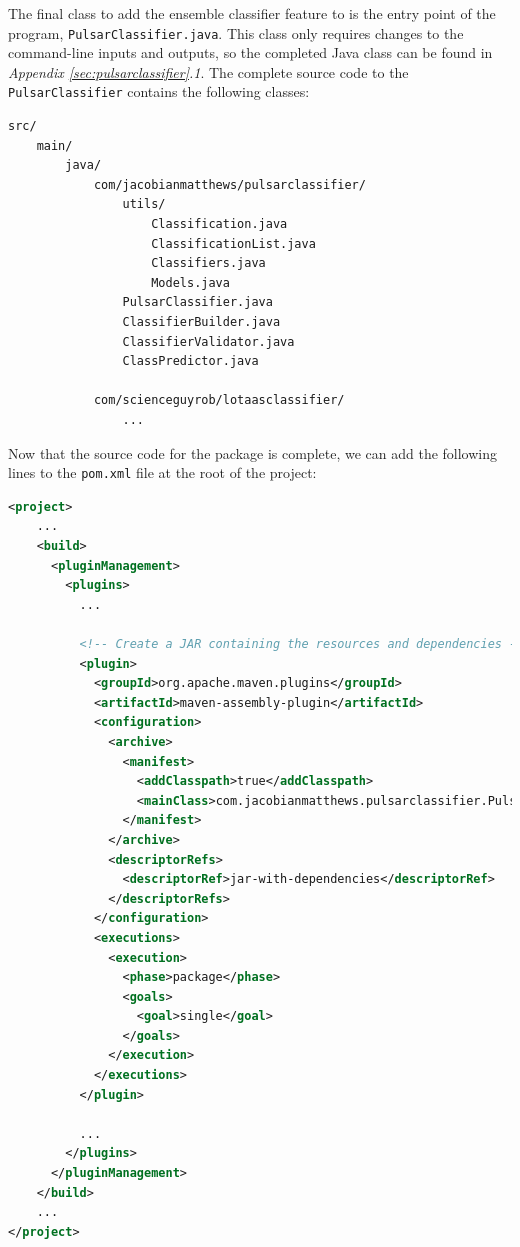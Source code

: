 \documentclass{article}
\begin{document}
The final class to add the ensemble classifier feature to is the entry point of the program, \verb|PulsarClassifier.java|. This class only requires changes to the command-line inputs and outputs, so the completed Java class can be found in \emph{Appendix \ref{sec:pulsarclassifier}.1}. The complete source code to the \verb|PulsarClassifier| contains the following classes:

\begin{lstlisting}[numbers=none]
src/
    main/
        java/
            com/jacobianmatthews/pulsarclassifier/
                utils/
                    Classification.java
                    ClassificationList.java
                    Classifiers.java
                    Models.java
                PulsarClassifier.java
                ClassifierBuilder.java
                ClassifierValidator.java
                ClassPredictor.java

            com/scienceguyrob/lotaasclassifier/
                ...

\end{lstlisting}

Now that the source code for the package is complete, we can add the following lines to the \verb|pom.xml| file at the root of the project:

\pagebreak
\begin{lstlisting}[numbers=none, language=xml, title=pom.xml, basicstyle=\footnotesize\ttfamily]
<project>
    ...
    <build>
      <pluginManagement>
        <plugins>
          ...

          <!-- Create a JAR containing the resources and dependencies -->
          <plugin>
            <groupId>org.apache.maven.plugins</groupId>
            <artifactId>maven-assembly-plugin</artifactId>
            <configuration>
              <archive>
                <manifest>
                  <addClasspath>true</addClasspath>
                  <mainClass>com.jacobianmatthews.pulsarclassifier.PulsarClassifier</mainClass>
                </manifest>
              </archive>
              <descriptorRefs>
                <descriptorRef>jar-with-dependencies</descriptorRef>
              </descriptorRefs>
            </configuration>
            <executions>
              <execution>
                <phase>package</phase>
                <goals>
                  <goal>single</goal>
                </goals>
              </execution>
            </executions>
          </plugin>

          ...
        </plugins>
      </pluginManagement>
    </build>
    ...
</project>
\end{lstlisting}
\end{document}
